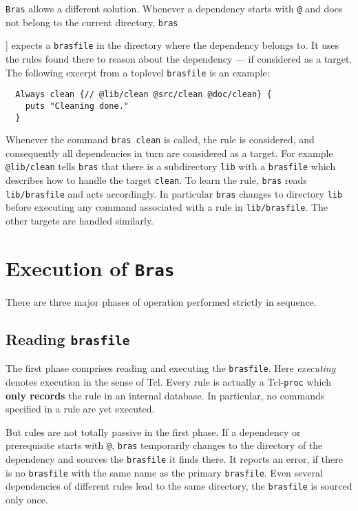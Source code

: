 \documentclass[12pt]{article}
\newcommand{\bras}{\texttt{bras}}
\newcommand{\Bras}{\texttt{Bras}}
\begin{document}
\Bras{} allows a different solution. Whenever a dependency starts with
\texttt{@} and does not belong to the current directory, \bras{] expects
a \texttt{brasfile} in the directory where the dependency belongs
to. It uses the rules found there to reason about the dependency ---
if considered as a target.  The following excerpt from a
toplevel \texttt{brasfile} is an example:

\begin{verbatim}
  Always clean {// @lib/clean @src/clean @doc/clean} {
    puts "Cleaning done."
  }
\end{verbatim}

Whenever the command \texttt{bras clean}
is called, the rule is considered, and consequently all
dependencies in turn are considered as a target. For example
\texttt{@lib/clean} tells \bras{} that there is a subdirectory
\texttt{lib} with a \texttt{brasfile} which
describes how to handle the target \texttt{clean}. To learn
the rule, \bras{} reads \texttt{lib/brasfile} and acts accordingly.
In particular \bras{} changes to directory \texttt{lib}
before executing any command associated with a rule in
\texttt{lib/brasfile}. The other targets are handled similarly.


\section{Execution of \Bras}

There are three major phases of operation performed strictly in
sequence.

\subsection{Reading \texttt{brasfile}}
The first phase comprises reading and executing the
\texttt{brasfile}. Here \textit{executing} 
denotes execution in the sense of Tcl. Every rule is actually a
Tcl-\texttt{proc} which \textbf{only records} the rule in an internal
database. In particular, no commands specified in a rule are yet
executed. 

But rules are not totally passive in the first phase. If a dependency
or prerequisite starts with \texttt{@}, \bras{} temporarily changes to the
directory of the dependency and sources the \texttt{brasfile} it finds
there. It reports an error, if there is no \texttt{brasfile} with the
same name as the primary \texttt{brasfile}. Even several dependencies
of different rules lead to the same directory, the \texttt{brasfile}
is sourced only once.

}
\end{document}
